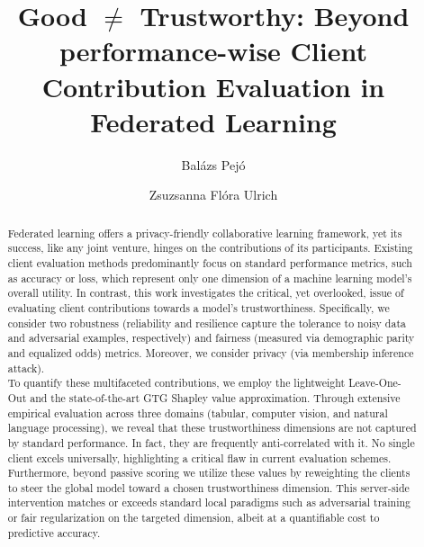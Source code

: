 \documentclass[acmsmall]{acmart}
\begin{document}
\title{Good $\not=$ Trustworthy: Beyond performance-wise Client Contribution Evaluation in Federated Learning}

\author{Bal{\'a}zs Pej{\'o}}

\author{Zsuzsanna Fl{\'o}ra Ulrich}


\begin{abstract}
    Federated learning offers a privacy-friendly collaborative learning framework, yet its success, like any joint venture, hinges on the contributions of its participants. Existing client evaluation methods predominantly focus on standard performance metrics, such as accuracy or loss, which represent only one dimension of a machine learning model's overall utility. In contrast, this work investigates the critical, yet overlooked, issue of evaluating client contributions towards a model's trustworthiness. Specifically, we consider two robustness (reliability and resilience capture the tolerance to noisy data and adversarial examples, respectively) and fairness (measured via demographic parity and equalized odds) metrics. Moreover, we consider privacy (via membership inference attack). \\    
    To quantify these multifaceted contributions, we employ the lightweight Leave-One-Out and the state-of-the-art GTG Shapley value approximation. Through extensive empirical evaluation across three domains (tabular, computer vision, and natural language processing), we reveal that these trustworthiness dimensions are not captured by standard performance. In fact, they are frequently anti-correlated with it. No single client excels universally, highlighting a critical flaw in current evaluation schemes. Furthermore, beyond passive scoring we utilize these values by reweighting the clients to steer the global model toward a chosen trustworthiness dimension. This server-side intervention matches or exceeds standard local paradigms such as adversarial training or fair regularization on the targeted dimension, albeit at a quantifiable cost to predictive accuracy. 
\end{abstract}
\end{document}
